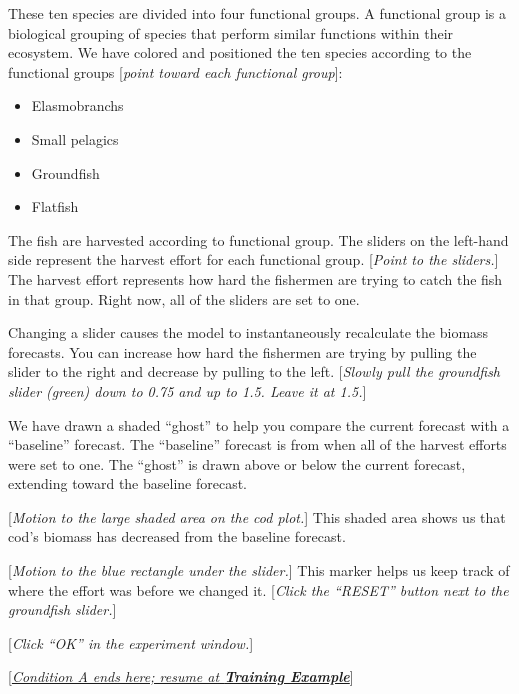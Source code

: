 {{{These ten species are divided into four functional groups.  A functional group is a biological grouping of species that perform similar functions within their ecosystem.  We have colored and positioned the ten species according to the functional groups [\textit{point toward each functional group}]:

\begin{itemize}
\item Elasmobranchs 
\item Small pelagics 
\item Groundfish
\item Flatfish
\end{itemize}

The fish are harvested according to functional group.  The sliders on the left-hand side represent the harvest effort for each functional group.  [\textit{Point to the sliders.}]  The harvest effort represents how hard the fishermen are trying to catch the fish in that group.  Right now, all of the sliders are set to one.

Changing a slider causes the model to instantaneously recalculate the biomass forecasts.  You can increase how hard the fishermen are trying by pulling the slider to the right and decrease by pulling to the left.  [\textit{Slowly pull the groundfish slider (green) down to 0.75 and up to 1.5.  Leave it at 1.5.}]

We have drawn a shaded ``ghost'' to help you compare the current forecast with a ``baseline'' forecast.  The ``baseline'' forecast is from when all of the harvest efforts were set to one.  The ``ghost'' is drawn above or below the current forecast, extending toward the baseline forecast.

[\textit{Motion to the large shaded area on the cod plot.}]  This shaded area shows us that cod’s biomass has decreased from the baseline forecast.

[\textit{Motion to the blue rectangle under the slider.}] This marker helps us keep track of where the effort was before we changed it.  [\textit{Click the ``RESET'' button next to the groundfish slider.}]

[\textit{Click ``OK'' in the experiment window.}]

[\underline{\textit{Condition A ends here; resume at \textbf{Training Example}}}]

}}}
